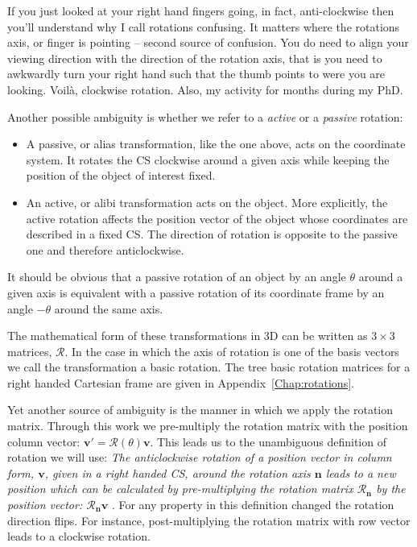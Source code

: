 If you just looked at your right hand fingers going, in fact, anti-clockwise then you'll understand why I call rotations confusing. It matters where the rotations axis, or finger is pointing -- second source of confusion. You do need to align your viewing direction with the direction of the rotation axis, that is you need to awkwardly turn your right hand such that the thumb points to were you are looking. Voil\`{a}, clockwise rotation. Also, my activity for months during my PhD. 

Another possible ambiguity is whether we refer to a \textit{active} or a \textit{passive} rotation:
\begin{itemize}
\item A passive, or alias transformation, like the one above, acts on the coordinate system. It rotates the CS clockwise around a given axis while keeping the position of the object of interest fixed.
\item An active, or alibi transformation acts on the object. More explicitly, the active rotation affects the position vector of the object whose coordinates are described in a fixed CS. The direction of rotation is opposite to the passive one and therefore anticlockwise.
\end{itemize}
It should be obvious that a passive rotation of an object by an angle $\theta$ around a given axis is equivalent with a passive rotation of its coordinate frame by an angle $-\theta$ around the same axis.

The mathematical form of these transformations in 3D can be written as $3\times 3$ matrices, $\mathcal{R}$. In the case in which the axis of rotation is one of the basis vectors we call the transformation a basic rotation. The tree basic rotation matrices for a right handed Cartesian frame are given in Appendix~\ref{Chap:rotations}. 

Yet another source of ambiguity is the manner in which we apply the rotation matrix. Through this work we pre-multiply the rotation matrix with the position column vector: $\mathbf{v'}=\mathcal{R}(\theta)\mathbf{v}$. This leads us to the unambiguous definition of rotation we will use: \textit{The anticlockwise rotation of a position vector in column form, $\mathbf{v}$, given in a right handed CS, around the rotation axis $\mathbf{n}$ leads to a new position which can be calculated by pre-multiplying the rotation matrix $\mathcal{R_{\mathbf{n}}}$ by the position vector: $\mathcal{R_{\mathbf{n}}} \mathbf{v}$ }. For any property in this definition changed the rotation direction flips. For instance, post-multiplying the rotation matrix with row vector leads to a clockwise rotation. 

